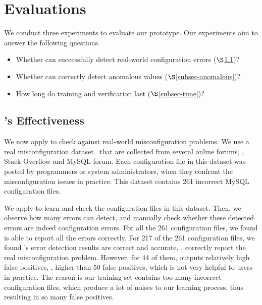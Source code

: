 
\section{Evaluations}
\label{sec-eval}

We conduct three experiments to evaluate our \app
prototype. Our experiments aim to answer the following
questions.

\begin{itemize}

\item Whether \app can successfully 
  detect real-world configuration errors ($\S$\ref{subsec-effectiveness})?

\item Whether \app can correctly detect anomalous values
($\S$\ref{subsec-anomalous})?

\item How long do training and verification last ($\S$\ref{subsec-time})?

\end{itemize}



\subsection{\app's Effectiveness}
\label{subsec-effectiveness}

We now apply \app to check against real-world misconfiguration problems.
We use a real misconfiguration dataset~\cite{configdataset}
that are collected from several online forums, \eg, 
Stack Overflow and MySQL forum.
Each configuration file in this dataset was posted by 
programmers or system administrators, 
when they confront the misconfiguration issues in practice.
This dataset contains 261 incorrect MySQL configuration files.

We apply \app to learn and check the configuration files in this
dataset. Then, we observe how many errors \app can detect,
and manually check whether these detected errors are indeed
configuration errors.
For all the 261 configuration files, we found \app is
able to report all the errors correctly.
For 217 of the 261 configuration files, we found \app's 
error detection results are correct and accurate,
\ie, correctly report the real misconfiguration problem.
However, for 44 of them, \app outputs relatively high false positives,
\eg, higher than 50 false positives,
which is not very helpful to users in practice.
The reason is our training set contains too many incorrect configuration
files, which produce a lot of noises to our learning process,
thus resulting in so many false positives.
  
